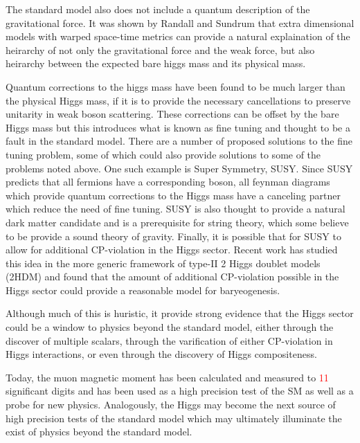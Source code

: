 The standard model also does not include a quantum description of the 
gravitational force.  It was shown by Randall and Sundrum that extra 
dimensional models with warped space-time metrics can provide a natural 
explaination of the heirarchy of not only the gravitational force and the 
weak force, but also heirarchy between the expected bare higgs mass and 
its physical mass. 

Quantum corrections to the higgs mass have been found to be much 
larger than the physical Higgs mass, if it is to provide the necessary   
cancellations to preserve unitarity in weak boson scattering.  These 
corrections can be offset by the bare Higgs mass but this introduces
what is known as fine tuning and thought to be a fault in the standard
model.  There are a number of proposed solutions to the fine tuning 
problem, some of which could also provide solutions to some of the 
problems noted above.  One such example is Super Symmetry, SUSY.  
Since SUSY predicts that all fermions have a corresponding boson, 
all feynman diagrams which provide quantum corrections to the Higgs 
mass have a canceling partner which reduce the need of fine tuning. 
SUSY is also thought to provide a natural dark matter candidate and
is a prerequisite for string theory, which some believe to be provide
a sound theory of gravity.  Finally, it is possible that for SUSY 
to allow for additional CP-violation in the Higgs sector.  Recent work
has studied this idea in the more generic framework of type-II 2 Higgs
doublet models (2HDM) and found that the amount of additional CP-violation
possible in the Higgs sector could provide a reasonable model for 
baryeogenesis.  

Although much of this is huristic, it provide strong evidence 
that the Higgs sector could be a window to physics beyond the standard
model, either through the discover of multiple scalars, through 
the varification of either CP-violation in Higgs interactions, or 
even through the discovery of Higgs compositeness.  

Today, the muon 
magnetic moment has been calculated and measured to \textcolor{red}{11} 
significant digits and has been used as a high precision test of the SM 
as well as a probe for new physics.   Analogously, the Higgs may become
the next source of high precision tests of the standard model which may
ultimately illuminate the exist of physics beyond the standard model.  

